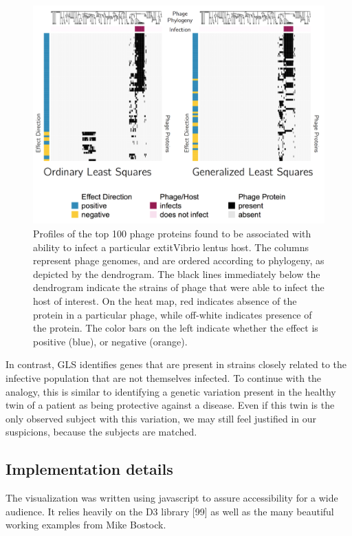 \documentclass[12pt,twoside]{mitthesis-manusdown}
\begin{document}
\begin{figure}[tb!]

{\centering \includegraphics[width=0.8\linewidth]{figuresviz/olsvgls} 

}

\caption{\label{fig:olsvgls}Profiles of the top 100 phage proteins found to be associated with ability to infect a particular   extit{Vibrio lentus} host. The columns represent phage genomes, and are ordered according to phylogeny, as depicted by the dendrogram. The black lines immediately below the dendrogram indicate the strains of phage that were able to infect the host of interest. On the heat map, red indicates absence of the protein in a particular phage, while off-white indicates presence of the protein. The color bars on the left indicate whether the effect is positive (blue), or negative (orange).}\label{fig:olsvgls}
\end{figure}
In contrast, GLS identifies genes that are present in strains closely
related to the infective population that are not themselves infected. To
continue with the analogy, this is similar to identifying a genetic
variation present in the healthy twin of a patient as being protective
against a disease. Even if this twin is the only observed subject with
this variation, we may still feel justified in our suspicions, because
the subjects are matched.

\subsection{Implementation details}\label{implementation-details}

The visualization was written using javascript to assure accessibility
for a wide audience. It relies heavily on the D3 library {[}99{]} as
well as the many beautiful working examples from Mike Bostock.
\end{document}
